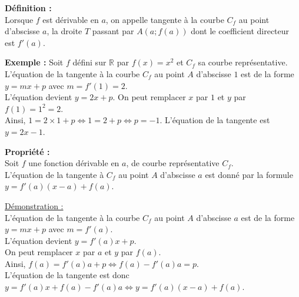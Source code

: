 \documentclass[11pt,a4paper]{article}
\begin{document}
\begin{mdframed}[style=definitionStyle]
    \textbf{Définition :} ~\\
    Lorsque $f$ est dérivable en $a$, on appelle tangente à la courbe $C_f$ au point d'abscisse $a$, la droite $T$ passant par $A(a;f(a))$ dont le coefficient directeur est $f'(a)$.
\end{mdframed}

\begin{minipage}{0.4\textwidth}
\end{minipage}
\hspace{0.05\textwidth}
\begin{minipage}{0.55\textwidth}
    \textbf{Exemple :} Soit $f$ défini sur $\mathbb{R}$ par $f(x)=x^2$ et $C_f$ sa courbe représentative. \\
    
    L'équation de la tangente à la courbe $C_f$ au point $A$ d'abscisse $1$ est de la forme $y=mx+p$ avec $m=f'(1)=2$. \\
    
    L'équation devient $y=2x+p$. On peut remplacer $x$ par $1$ et $y$ par $f(1)=1^2=2$. ~\\

    Ainsi, $1=2\times1+p\Leftrightarrow1=2+p\Leftrightarrow p=-1$.
    L'équation de la tangente est $y=2x-1$.
\end{minipage}

\begin{mdframed}[style=proprieteStyle]
	\textbf{Propriété :} ~\\
    Soit $f$ une fonction dérivable en $a$, de courbe représentative $C_f$. \\
L'équation de la tangente à $C_f$ au point $A$ d'abscisse $a$ est donné par la formule $y=f'(a)(x-a)+f(a)$.
\end{mdframed}

\underline{Démonstration :} \\

L'équation de la tangente à la courbe $C_f$ au point $A$ d'abscisse $a$ est de la forme $y=mx+p$ avec $m=f'(a)$. \\
L'équation devient $y=f'(a)x+p$. \\
On peut remplacer $x$ par $a$ et $y$ par $f(a)$. \\
Ainsi, $f(a)=f'(a)a+p\Leftrightarrow f(a)-f'(a)a=p$. \\

L'équation de la tangente est donc $y=f'(a)x+f(a)-f'(a)a\Leftrightarrow y=f'(a)(x-a)+f(a)$.
\end{document}
